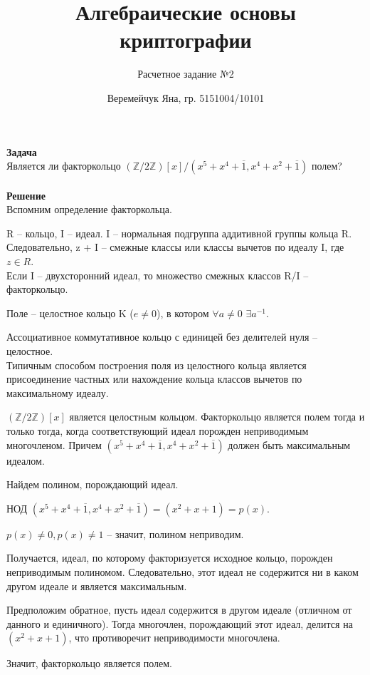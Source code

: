 \documentclass{article}
\title{Алгебраические основы криптографии}
\author{Расчетное задание №2}
\date{Веремейчук Яна, гр. 5151004/10101}
\begin{document}
\maketitle

\textbf{Задача}\\

Является ли факторкольцо $\left(\mathbb{Z}/2\mathbb{Z}\right)[x] / (x^{5} + x^{4} + \overline{1}, x^{4} + x^{2} + \overline{1})$ полем?\\
\\

\textbf{Решение}\\

Вспомним определение факторкольца.

R -- кольцо, I -- идеал.
I -- нормальная подгруппа аддитивной группы кольца R. Следовательно, z + I -- смежные классы или классы вычетов по идеалу I, где $z \in R$.\\
Если I -- двухсторонний идеал, то множество смежных классов R/I -- факторкольцо.

Поле -- целостное кольцо K ($e \neq 0$), в котором $\forall a\neq 0$ $\exists a^{-1}$.

Ассоциативное коммутативное кольцо с единицей без делителей нуля -- целостное.\\

Типичным способом построения поля из целостного кольца является присоединение частных или нахождение кольца классов вычетов по максимальному идеалу.

\mbox{$\left(\mathbb{Z}/2\mathbb{Z}\right)[x]$} является целостным кольцом. Факторкольцо является полем тогда и только тогда, когда соответствующий идеал порожден неприводимым многочленом. Причем \mbox{$ (x^{5} + x^{4} + \overline{1}, x^{4} + x^{2} + \overline{1})$} должен быть максимальным идеалом.

Найдем полином, порождающий идеал.

НОД
\mbox{$(x^{5} + x^{4} + \overline{1}, x^{4} + x^{2} + \overline{1}) = (x^{2} + x + 1) = p(x)$}.

\mbox{$p(x)\neq 0, p(x)\neq 1$} -- значит, полином неприводим.

Получается, идеал, по которому факторизуется исходное кольцо, порожден неприводимым полиномом. Следовательно, этот идеал не содержится ни в каком другом идеале и является максимальным.

Предположим обратное, пусть идеал содержится в другом идеале (отличном от данного и единичного). Тогда многочлен, порождающий этот идеал, делится на $(x^{2} + x + 1)$, что противоречит неприводимости многочлена.

Значит, факторкольцо является полем.
\end{document}
